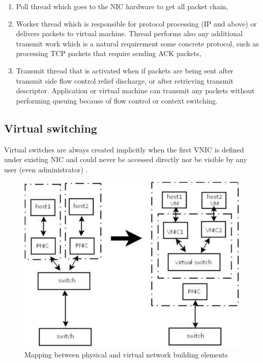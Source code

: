 \documentclass[11pt]{book}
\begin{document}
        \begin{enumerate}
          \item Poll thread which goes to the NIC hardware to get all packet chain,
          \item Worker thread which is responsible for protocol processing (IP and above) or delivers packets to virtual
                machine. Thread performs also any additional transmit work which is a natural 
                requirement some concrete protocol, such as processing TCP packets that require sending ACK packets,
          \item Transmit thread that is activated when if packets are being sent after transmit side flow control relief
                discharge, or after retrieving transmit descriptor. Application or virtual 
                machine can transmit any packets without performing queuing because of flow control or context switching.
        \end{enumerate}


      \subsection{Virtual switching}
        
        Virtual switches are always created implicitly when the first VNIC is defined under existing NIC and could never
        be accessed directly nor be visible by any user (even administrator) \cite{crossbow2}. 
        
        \begin{figure}[H]
          \begin{center}
            \includegraphics[width=.7\textwidth]{img/physical_and_virtual_switches_mapping.pdf}
          \end{center}

          \caption{Mapping between physical and virtual network building elements}
        \end{figure}
        
\end{document}
